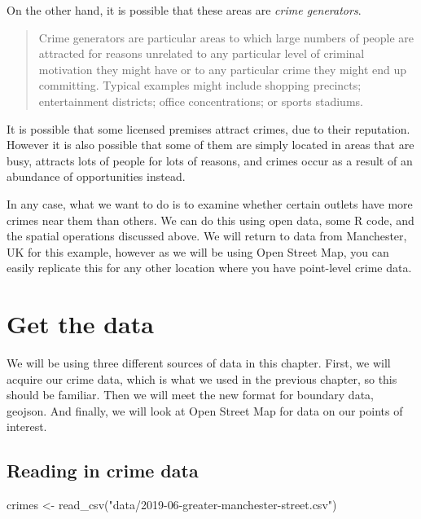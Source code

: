 \documentclass[
]{book}
\makeatletter
\newenvironment{Shaded}{\begin{snugshade}}{\end{snugshade}}
\newcommand{\FunctionTok}[1]{\textcolor[rgb]{0,0,0}{#1}}
\newcommand{\NormalTok}[1]{#1}
\newcommand{\OtherTok}[1]{\textcolor[rgb]{0.37,0.37,0.37}{#1}}
\newcommand{\StringTok}[1]{\textcolor[rgb]{0.5,0.5,0.5}{#1}}
\newenvironment{kframe}{%
\medskip{}
\setlength{\fboxsep}{.8em}
 \def\at@end@of@kframe{}%
 \ifinner\ifhmode%
  \def\at@end@of@kframe{\end{minipage}}%
  \begin{minipage}{\columnwidth}%
 \fi\fi%
 \def\FrameCommand##1{\hskip\@totalleftmargin \hskip-\fboxsep
 \colorbox{shadecolor}{##1}\hskip-\fboxsep
     \hskip-\linewidth \hskip-\@totalleftmargin \hskip\columnwidth}%
 \MakeFramed {\advance\hsize-\width
   \@totalleftmargin\z@ \linewidth\hsize
   \@setminipage}}%
 {\par\unskip\endMakeFramed%
 \at@end@of@kframe}
\renewenvironment{Shaded}{\begin{kframe}}{\end{kframe}}
\makeatother
\begin{document}
On the other hand, it is possible that these areas are \emph{crime generators}.

\begin{quote}
Crime generators are particular areas to which large numbers of people are attracted for reasons unrelated to any particular level of criminal motivation they might have or to any particular crime they might end up committing. Typical examples might include shopping precincts; entertainment districts; office concentrations; or sports stadiums.
\end{quote}

It is possible that some licensed premises attract crimes, due to their reputation. However it is also possible that some of them are simply located in areas that are busy, attracts lots of people for lots of reasons, and crimes occur as a result of an abundance of opportunities instead.

In any case, what we want to do is to examine whether certain outlets have more crimes near them than others. We can do this using open data, some R code, and the spatial operations discussed above. We will return to data from Manchester, UK for this example, however as we will be using Open Street Map, you can easily replicate this for any other location where you have point-level crime data.

\hypertarget{get-the-data}{%
\section{Get the data}\label{get-the-data}}

We will be using three different sources of data in this chapter. First, we will acquire our crime data, which is what we used in the previous chapter, so this should be familiar. Then we will meet the new format for boundary data, geojson. And finally, we will look at Open Street Map for data on our points of interest.

\hypertarget{reading-in-crime-data}{%
\subsection{Reading in crime data}\label{reading-in-crime-data}}

\begin{Shaded}
\begin{Highlighting}[]
\NormalTok{crimes }\OtherTok{\textless{}{-}} \FunctionTok{read\_csv}\NormalTok{(}\StringTok{"data/2019{-}06{-}greater{-}manchester{-}street.csv"}\NormalTok{)}
\end{Highlighting}
\end{Shaded}
\end{document}
